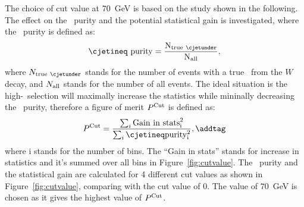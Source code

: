 The choice of cut value at $70$~GeV is based on the
study shown in the following. 
The effect on the \cjet\ purity and the potential statistical gain is investigated, 
where the \cjet\ purity is defined as:
\begin{equation}
\cjetineq\ \rm{purity} = \frac{N_{\rm{true}\ \cjetunder}}{N_{\rm{all}}},
\end{equation}
where $N_{\rm{true}\ \cjetunder}$ stands for the number of events with a 
true \cjet\ from the $W$ decay, and $N_{\rm{all}}$ stands for the number of all events. 
The ideal situation is the high-\pt\ selection will maximally increase the 
statistics while mininally decreasing the \cjet\ purity, therefore a figure of merit $P^{\rm{Cut}}$
is defined as:
\[P^{\rm{Cut}} = \frac{\sum_i{\rm{Gain\ in\ stats}^2_i}}{\sum_i{\cjetineq \rm{purity}^2_i }},  \addtag \]
where i stands for the number of bins. The ``Gain in stats'' stands for increase in 
statistics and it's summed over all bins in Figure~\ref{fig:cutvalue}.
The \cjet\ purity and the statistical gain are calculated for 4 different cut 
values as shown in Figure~\ref{fig:cutvalue}, comparing with the cut value of 0. 
The value of $70$~GeV is chosen as it gives the highest value of $P^{\rm{Cut}}$. 


